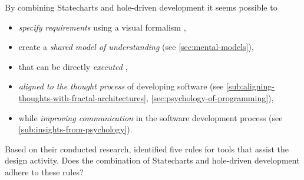By combining Statecharts and hole-driven development it seems possible to
\begin{itemize}
    \item \emph{specify requirements} using a visual formalism \autocite{leveson_experiences_1991},
    \item create a \emph{shared model of understanding} (see \cref{sec:mental-models}),
    \item that can be directly \emph{executed} \autocite{harel_statecharts:_1987},
    \item \emph{aligned to the thought process} of developing software (see \cref{sub:aligning-thoughts-with-fractal-architectures}, \cref{sec:psychology-of-programming}),
    \item while \emph{improving communication} in the software development process (see \cref{sub:insights-from-psychology}).
\end{itemize}
\textcite{visser_expert_1990} 
Based on their conducted research, \textcite{visser_expert_1990} identified five rules for tools that assist the design activity.
Does the combination of Statecharts and hole-driven development adhere to these rules?



